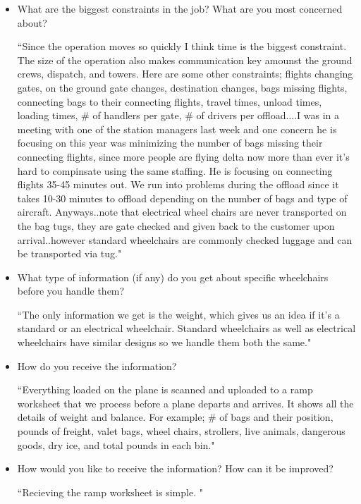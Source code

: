 \begin{itemize}
\item What are the biggest constraints in the job? What are you most concerned about?

``Since the operation moves so quickly I think time is the biggest constraint.  The size of the operation also makes communication key amounst the ground crews, dispatch, and towers. Here are some other constraints; flights changing gates, on the ground gate changes, destination changes, bags missing flights, connecting bags to their connecting flights, travel times, unload times, loading times, \# of handlers per gate, \# of drivers per offload....I was in a meeting with one of the station managers last week and one concern he is focusing on this year was minimizing the number of bags missing their connecting flights, since more people are flying delta now more than ever it's hard to compinsate using the same staffing. He is focusing on connecting flights 35-45 minutes out. We run into problems during the offload since it takes 10-30 minutes to offload depending on the number of bags and type of aircraft. Anyways..note that electrical wheel chairs are never transported on the bag tugs, they are gate checked and given back to the customer upon arrival..however standard wheelchairs are commonly checked luggage and can be transported via tug."

\item What type of information (if any) do you get about specific wheelchairs before you handle them?

``The only information we get is the weight, which gives us an idea if it's a standard or an electrical wheelchair. Standard wheelchairs as well as electrical wheelchairs have similar designs so we handle them both the same."

\item How do you receive the information?

``Everything loaded on the plane is scanned and uploaded to a ramp worksheet that we process before a plane departs and arrives. It shows all the details of weight and balance. For example; \# of bags and their position, pounds of freight, valet bags, wheel chairs, strollers, live animals, dangerous goods, dry ice, and total pounds in each bin."

\item How would you like to receive the information? How can it be improved?

``Recieving the ramp worksheet is simple. "


\end{itemize}

